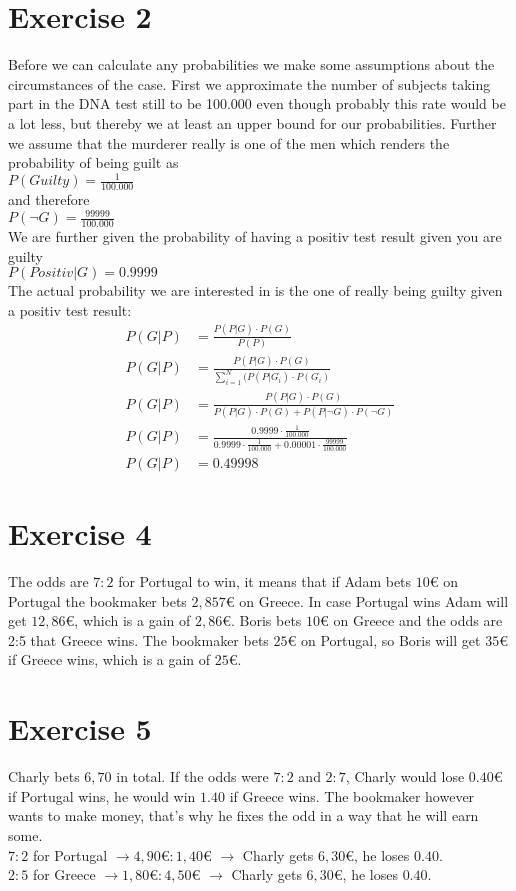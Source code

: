 \def \TutorialSheetNumber{3}


\section*{Exercise 2}
Before we can calculate any probabilities we make some assumptions about the circumstances of the case. First we approximate the number of subjects taking part in the DNA test still to be 100.000 even though probably this rate would be a lot less, but thereby we at least an upper bound for our probabilities. Further we assume that the murderer really is one of the men which renders the probability of being guilt as \\ 
$P(Guilty) = \frac{1}{100.000}$\\
and therefore\\
$P(\neg G) = \frac{99999}{100.000}$\\
We are further given the probability of having a positiv test result given you are guilty \\
$P(Positiv|G) = 0.9999 $ \\
The actual probability we are interested in is the one of really being guilty given a positiv test result:
\begin{align*}
  P(G | P) & = \frac{P(P|G) \cdot P(G)}{P(P)} \\
  P(G | P) & = \frac{P(P|G) \cdot P(G)}{\sum_{i=1}^{N}(P(P|G_i)\cdot P(G_i)}\\
  P(G | P) & = \frac{P(P|G) \cdot P(G)}{P(P|G)\cdot P(G) + P(P|\neg G)\cdot P(\neg G)} \\
  P(G | P) & = \frac{0.9999 \cdot \frac{1}{100.000}}{0.9999 \cdot \frac{1}{100.000} + 0.00001 \cdot \frac{99999}{100.000}}\\
  P(G | P) & = 0.49998
\end{align*}
 
\section*{Exercise 4}
The odds are $7 : 2$ for Portugal to win, it means that if Adam bets $10\euro$ on Portugal the bookmaker bets $2,857€$ on Greece. In case Portugal wins Adam will get $12,86€$, which is a gain of $2,86€$.
Boris bets $10€$ on Greece and the odds are 2:5 that Greece wins. The bookmaker bets $25€$ on Portugal, so Boris will get $35€$ if Greece wins, which is a gain of $25€$.

\section*{Exercise 5}
Charly bets $6,70$ in total.
If the odds were $7 : 2$ and $2 : 7$, Charly would lose $0.40€$ if Portugal wins, he would win $1.40$ if Greece wins. The bookmaker however wants to make money, that's why he fixes the odd in a way that he will earn some.\\
$7 : 2$ for Portugal $\rightarrow 4,90€ : 1,40€$ $\rightarrow$ Charly gets $6,30€$, he loses $0.40$.\\
$2 : 5$ for Greece $\rightarrow 1,80€ : 4,50€$ $\rightarrow$ Charly gets $6,30€$, he loses $0.40$.


